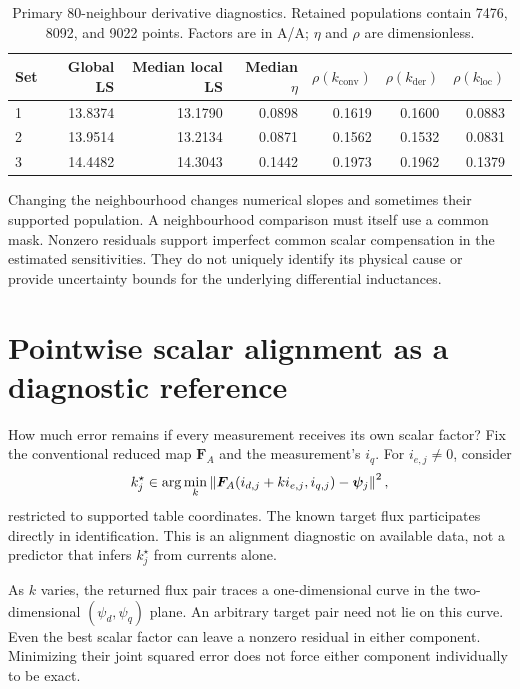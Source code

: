\begin{table}[htbp]
\centering\small
\caption{Primary 80-neighbour derivative diagnostics. Retained populations contain 7476, 8092, and 9022 points. Factors are in A/A; $\eta$ and $\rho$ are dimensionless.}
\label{tab:local-diagnostics}
\begin{tabular}{lrrrrrr}
\toprule
Set & Global LS & Median local LS & Median $\eta$ & $\rho(k_{\mathrm{conv}})$ & $\rho(k_{\mathrm{der}})$ & $\rho(k_{\mathrm{loc}})$\\
\midrule
1 & 13.8374 & 13.1790 & 0.0898 & 0.1619 & 0.1600 & 0.0883\\
2 & 13.9514 & 13.2134 & 0.0871 & 0.1562 & 0.1532 & 0.0831\\
3 & 14.4482 & 14.3043 & 0.1442 & 0.1973 & 0.1962 & 0.1379\\
\bottomrule
\end{tabular}
\end{table}

Changing the neighbourhood changes numerical slopes and sometimes their supported population. A neighbourhood comparison must itself use a common mask. Nonzero residuals support imperfect common scalar compensation in the estimated sensitivities. They do not uniquely identify its physical cause or provide uncertainty bounds for the underlying differential inductances.

\section{Pointwise scalar alignment as a diagnostic reference}

How much error remains if every measurement receives its own scalar factor? Fix the conventional reduced map $\bm F_A$ and the measurement's $i_q$. For $i_{e,j}\ne0$, consider
\begin{equation}
k_j^\star\in\arg\min_k
\left\lVert\bm F_A(i_{d,j}+k i_{e,j},i_{q,j})-\bm\psi_j\right\rVert^2,
\label{eq:pointwise-scalar}
\end{equation}
restricted to supported table coordinates. The known target flux participates directly in identification. This is an alignment diagnostic on available data, not a predictor that infers $k_j^\star$ from currents alone.

As $k$ varies, the returned flux pair traces a one-dimensional curve in the two-dimensional $(\psi_d,\psi_q)$ plane. An arbitrary target pair need not lie on this curve. Even the best scalar factor can leave a nonzero residual in either component. Minimizing their joint squared error does not force either component individually to be exact.


